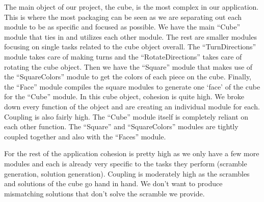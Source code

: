 \documentclass[12pt]{article}
\begin{document}
\par
The main object of our project, the cube, is the most complex  in our application. This is where the most packaging can be seen as we are separating out each module to be as specific and focused as possible. We have the main “Cube” module that ties in and utilizes each other module. The rest are smaller modules focusing on single tasks related to the cube object overall. The “TurnDirections” module takes care of making turns and the “RotateDirections” takes care of rotating the cube object. Then we have the “Square” module that makes use of the “SquareColors” module to get the colors of each piece on the cube. Finally, the “Face” module compiles the square modules to generate one ‘face’ of the cube for the “Cube” module. In this cube object, cohesion is quite high. We broke down every function of the object and are creating an individual module for each. Coupling is also fairly high. The “Cube” module itself is completely reliant on each other function. The “Square” and “SquareColors” modules are tightly coupled together and also with the “Faces” module. \\

\par
For the rest of the application cohesion is pretty high as we only have a few more modules and each is already very specific to the tasks they perform (scramble generation, solution generation). Coupling is moderately high as the scrambles and solutions of the cube go hand in hand. We don’t want to produce mismatching solutions that don’t solve the scramble we provide. \\
\end{document}
